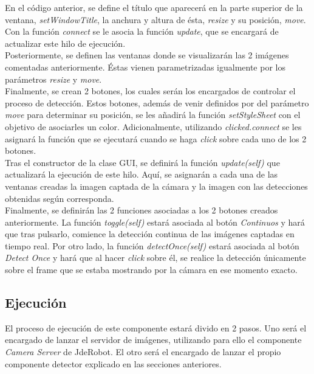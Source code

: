 \documentclass[a4paper, 12pt, spanish, chapterprefix, numbers=noenddot]{book}
\begin{document}
En el código anterior, se define el título que aparecerá en la parte superior de la ventana, \textit{setWindowTitle}, la anchura y altura de ésta, \textit{resize} y su posición, \textit{move}. Con la función \textit{connect} se le asocia la función \textit{update}, que se encargará de actualizar este hilo de ejecución.\\

Posteriormente, se definen las ventanas donde se visualizarán las 2 imágenes comentadas anteriormente. Éstas vienen parametrizadas igualmente por los parámetros \textit{resize} y \textit{move}.\\

Finalmente, se crean 2 botones, los cuales serán los encargados de controlar el proceso de detección. Estos botones, además de venir definidos por del parámetro \textit{move} para determinar su posición, se les añadirá la función \textit{setStyleSheet} con el objetivo de asociarles un color. Adicionalmente, utilizando \textit{clicked.connect} se les asignará la función que se ejecutará cuando se haga \textit{click} sobre cada uno de los 2 botones.\\

Tras el constructor de la clase GUI, se definirá la función \textit{update(self)} que actualizará la ejecución de este hilo. Aquí, se asignarán a cada una de las ventanas creadas la imagen captada de la cámara y la imagen con las detecciones obtenidas según corresponda.\\

Finalmente, se definirán las 2 funciones asociadas a los 2 botones creados anteriormente. La función \textit{toggle(self)} estará asociada al botón \textit{Continuos} y hará que tras pulsarlo, comience la detección continua de las imágenes captadas en tiempo real. Por otro lado, la función \textit{detectOnce(self)} estará asociada al botón \textit{Detect Once} y hará que al hacer \textit{click} sobre él, se realice la detección únicamente sobre el frame que se estaba mostrando por la cámara en ese momento exacto.

\subsection{Ejecución}

El proceso de ejecución de este componente estará divido en 2 pasos. Uno será el encargado de lanzar el servidor de imágenes, utilizando para ello el componente \textit{Camera Server} de JdeRobot. El otro será el encargado de lanzar el propio componente detector explicado en las secciones anteriores.\\
\end{document}
